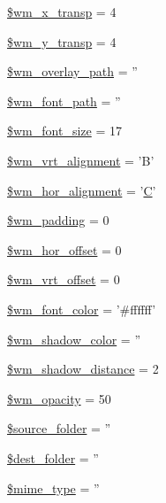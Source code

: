 \begin{DoxyCompactItemize}
\item 
\hyperlink{class_c_i___image__lib_a720496900551e5c29b11a732fb4f35ab}{\$wm\-\_\-x\-\_\-transp} = 4
\item 
\hyperlink{class_c_i___image__lib_aa9ab81b196739723a7c38d9431c9fa11}{\$wm\-\_\-y\-\_\-transp} = 4
\item 
\hyperlink{class_c_i___image__lib_a82ec5b8a6822dc7f9c70f4b5aafdebd4}{\$wm\-\_\-overlay\-\_\-path} = ''
\item 
\hyperlink{class_c_i___image__lib_a6870985f3e6bbf1a29e5875c054598f4}{\$wm\-\_\-font\-\_\-path} = ''
\item 
\hyperlink{class_c_i___image__lib_a0ea2a2f73623aa0631670017a4e68419}{\$wm\-\_\-font\-\_\-size} = 17
\item 
\hyperlink{class_c_i___image__lib_a1c52f46917a30e084db07a8c8e13af86}{\$wm\-\_\-vrt\-\_\-alignment} = 'B'
\item 
\hyperlink{class_c_i___image__lib_a74d790b77baa0c22cd0b812abc41765c}{\$wm\-\_\-hor\-\_\-alignment} = '\hyperlink{mathquill_8js_a3a8aaabfd7ed4c8517175784bf8633c4}{C}'
\item 
\hyperlink{class_c_i___image__lib_ab1f63f5ae604d060dbc39653f6440826}{\$wm\-\_\-padding} = 0
\item 
\hyperlink{class_c_i___image__lib_aed778e3e9ecb74e8c61d8c4894581f7f}{\$wm\-\_\-hor\-\_\-offset} = 0
\item 
\hyperlink{class_c_i___image__lib_a577602650e0c67f9f4bfcdeda075fa50}{\$wm\-\_\-vrt\-\_\-offset} = 0
\item 
\hyperlink{class_c_i___image__lib_ae9498442637ff2466d4426af45f68c6b}{\$wm\-\_\-font\-\_\-color} = '\#ffffff'
\item 
\hyperlink{class_c_i___image__lib_aca292b49514fe3238440675c4b2642ca}{\$wm\-\_\-shadow\-\_\-color} = ''
\item 
\hyperlink{class_c_i___image__lib_a3d5174ca66ce7149799b5830873aa747}{\$wm\-\_\-shadow\-\_\-distance} = 2
\item 
\hyperlink{class_c_i___image__lib_a9cc2d95dbcbb26a2f3f0c7416fc5920b}{\$wm\-\_\-opacity} = 50
\item 
\hyperlink{class_c_i___image__lib_a8fa5462b549251df178487f869c49800}{\$source\-\_\-folder} = ''
\item 
\hyperlink{class_c_i___image__lib_a23c580d10b1ba89c5b532f43fe2c6f59}{\$dest\-\_\-folder} = ''
\item 
\hyperlink{class_c_i___image__lib_a4d1985caafb49b059e3ca3dedfee257a}{\$mime\-\_\-type} = ''
\item 

\end{DoxyCompactItemize}
